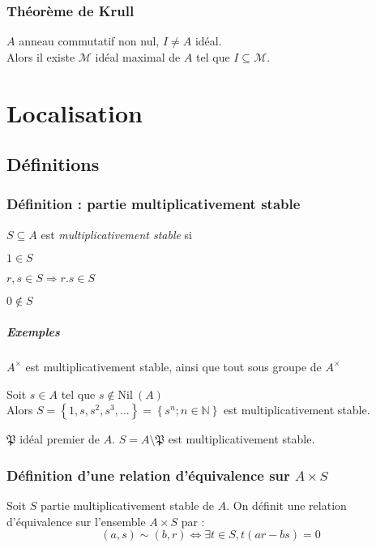 \documentclass[reqno,a4paper,10pt]{report}
\makeatletter
\newcommand{\set}[1]{\left\lbrace #1 \right\rbrace} %
\newcommand{\nil}{\mathrm{Nil}\:} %
\newcommand{\IN}{\ensuremath{\mathbb{N}}\xspace} %
\newcommand{\so}{\Rightarrow}
\let\olditemize=\itemize%
\renewenvironment{itemize}{%
    \olditemize%
  }{%
    \@noparlisttrue%
    \endlist%
  }%
\let\oldenumerate=\enumerate%
\renewenvironment{enumerate}{%
    \oldenumerate%
  }{%
    \@noparlisttrue%
    \endlist%
  }%
\makeatother
\begin{document}
\subsection{Théorème de Krull}
$A$ anneau commutatif non nul, $I\neq A$ idéal.\\
Alors il existe $\mathcal{M}$ idéal maximal de $A$ tel que $I\subseteq
\mathcal M$.

\begin{comment}
  Preuve 12/11/09 p1 verso
\end{comment}

\chapter{Localisation}
\section{Définitions}
\subsection{Définition : partie multiplicativement stable}
$S \subseteq A$ est \emph{multiplicativement stable} si
\begin{enumerate}[(i)]
  \item $1\in S$
  \item $r,s \in S \so r.s \in S$
  \item $0 \not\in S$
\end{enumerate}

\paragraph{Exemples}
\begin{itemize}
  \item $A^\times$ est multiplicativement stable, ainsi que tout sous groupe de
    $A^\times$
  \item Soit $s\in A$ tel que $s\not \in \nil(A)$\\
    Alors $S=\set{1,s,s^2,s^3,\dots}=\set{s^n;n\in \IN}$ est
    multiplicativement stable.
  \item $\mathfrak{P}$ idéal premier de $A$. $S=A\setminus \mathfrak P$ est
    multiplicativement stable.
    \begin{comment}
      Preuve 12/11/09 p2
    \end{comment}
\end{itemize}

\subsection{Définition d'une relation d'équivalence sur $A\times S$}
Soit $S$ partie multiplicativement stable de $A$. On définit une relation
d'équivalence sur l'ensemble $A\times S$ par :
\[(a,s) \sim (b,r) \iff \exists t \in S, t(ar-bs)=0\]
\end{document}
